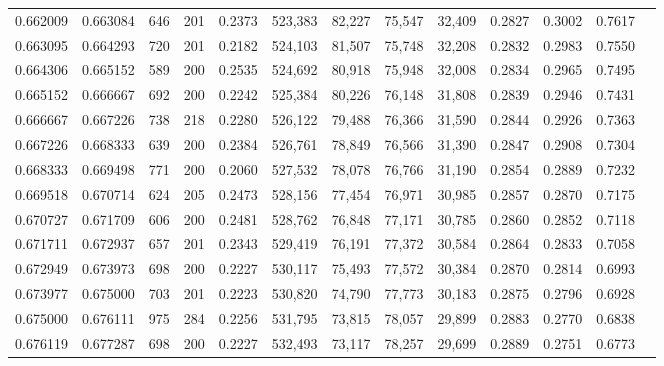 \begin{tabular}{rrrrrrrrrrrrr}
0.662009 & 0.663084 &    646 &   201 &                                     0.2373 & 523,383 &  82,227 &  75,547 &  32,409 & 0.2827 & 0.3002 & 0.7617 \\
0.663095 & 0.664293 &    720 &   201 &                                     0.2182 & 524,103 &  81,507 &  75,748 &  32,208 & 0.2832 & 0.2983 & 0.7550 \\
0.664306 & 0.665152 &    589 &   200 &                                     0.2535 & 524,692 &  80,918 &  75,948 &  32,008 & 0.2834 & 0.2965 & 0.7495 \\
0.665152 & 0.666667 &    692 &   200 &                                     0.2242 & 525,384 &  80,226 &  76,148 &  31,808 & 0.2839 & 0.2946 & 0.7431 \\
0.666667 & 0.667226 &    738 &   218 &                                     0.2280 & 526,122 &  79,488 &  76,366 &  31,590 & 0.2844 & 0.2926 & 0.7363 \\
0.667226 & 0.668333 &    639 &   200 &                                     0.2384 & 526,761 &  78,849 &  76,566 &  31,390 & 0.2847 & 0.2908 & 0.7304 \\
0.668333 & 0.669498 &    771 &   200 &                                     0.2060 & 527,532 &  78,078 &  76,766 &  31,190 & 0.2854 & 0.2889 & 0.7232 \\
0.669518 & 0.670714 &    624 &   205 &                                     0.2473 & 528,156 &  77,454 &  76,971 &  30,985 & 0.2857 & 0.2870 & 0.7175 \\
0.670727 & 0.671709 &    606 &   200 &                                     0.2481 & 528,762 &  76,848 &  77,171 &  30,785 & 0.2860 & 0.2852 & 0.7118 \\
0.671711 & 0.672937 &    657 &   201 &                                     0.2343 & 529,419 &  76,191 &  77,372 &  30,584 & 0.2864 & 0.2833 & 0.7058 \\
0.672949 & 0.673973 &    698 &   200 &                                     0.2227 & 530,117 &  75,493 &  77,572 &  30,384 & 0.2870 & 0.2814 & 0.6993 \\
0.673977 & 0.675000 &    703 &   201 &                                     0.2223 & 530,820 &  74,790 &  77,773 &  30,183 & 0.2875 & 0.2796 & 0.6928 \\
0.675000 & 0.676111 &    975 &   284 &                                     0.2256 & 531,795 &  73,815 &  78,057 &  29,899 & 0.2883 & 0.2770 & 0.6838 \\
0.676119 & 0.677287 &    698 &   200 &                                     0.2227 & 532,493 &  73,117 &  78,257 &  29,699 & 0.2889 & 0.2751 & 0.6773 \\

\end{tabular}
